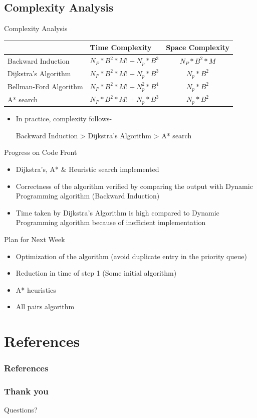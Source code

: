 \documentclass{beamer}
\makeatletter
\newcounter{multipleslide}
\newcommand{\multipleframe}
{
	\setcounter{multipleslide}{\value{framenumber}}
	\stepcounter{multipleslide}
	\patchcmd{\beamer@@tmpl@footline}
	{\insertframenumber}
	{\themultipleslide}
	{}
	{}
}
\newcommand{\restoreframe}
{
	\patchcmd{\beamer@@tmpl@footline}
	{\themultipleslide}
  	{\insertframenumber}
	{}
	{}
	\setcounter{framenumber}{\value{multipleslide}}
}
\makeatother
\begin{document}
\subsection{Complexity Analysis}
\begin{frame}{Complexity Analysis}
\begin{table}
\begin{tabular}{|p{2.5cm}|p{4cm}|c|}
\hline
 & \textbf{Time Complexity} & \textbf{Space Complexity} \\
\hline
Backward Induction & $N_P*B^{2}*M! + N_p*B^3$ & $N_P*B^{2}*M$ \\
\hline
Dijkstra's Algorithm & $N_P*B^{2}*M! + N_p*B^3$ & $N_p*B^2$ \\
\hline
Bellman-Ford Algorithm & $N_P*B^{2}*M! + N_p^2*B^4$ & $N_p*B^2$ \\
\hline
A* search & $N_P*B^{2}*M! + N_p*B^3$ & $N_p*B^2$ \\
\hline
\end{tabular}
\end{table}
\begin{itemize}
\item In practice, complexity follows-
\begin{center}
Backward Induction > Dijkstra's Algorithm > A* search
\end{center}
\end{itemize}
\end{frame}

\begin{frame}{Progress on Code Front}
\begin{itemize}
\item Dijkstra's, A* \& Heuristic search implemented
\item Correctness of the algorithm verified by comparing the output with Dynamic Programming algorithm (Backward Induction)
\item Time taken by Dijkstra's Algorithm is high compared to Dynamic Programming algorithm because of inefficient implementation
\end{itemize}
\end{frame}

\begin{frame}{Plan for Next Week}
\begin{itemize}
\item Optimization of the algorithm (avoid duplicate entry in the priority queue)
\item Reduction in time of step 1 (Some initial algorithm)
\item A* heuristics
\item All pairs algorithm
\end{itemize}
\end{frame}

\section{References}
\multipleframe
\begin{frame}[allowframebreaks]
\frametitle{References}
\nocite{coursera}
\nocite{cormen}


\end{frame}
\restoreframe

\begin{frame} \frametitle{Thank you}
\Huge{\centerline{\color{theme_color}Questions?}}
\end{frame}
\end{document}
